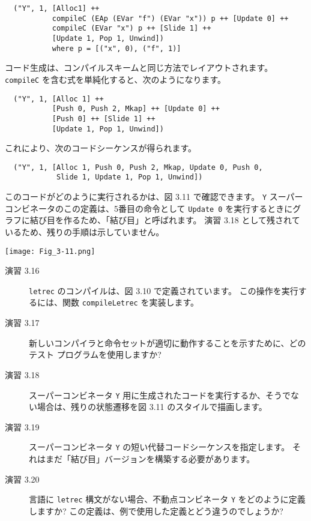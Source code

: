 \documentclass{jarticle}
\begin{document}
\begin{verbatim}
  ("Y", 1, [Alloc1] ++
           compileC (EAp (EVar "f") (EVar "x")) p ++ [Update 0] ++
           compileC (EVar "x") p ++ [Slide 1] ++
           [Update 1, Pop 1, Unwind])
           where p = [("x", 0), ("f", 1)]
\end{verbatim}

コード生成は、コンパイルスキームと同じ方法でレイアウトされます。
\texttt{compileC} を含む式を単純化すると、次のようになります。

\begin{verbatim}
  ("Y", 1, [Alloc 1] ++
           [Push 0, Push 2, Mkap] ++ [Update 0] ++
           [Push 0] ++ [Slide 1] ++
           [Update 1, Pop 1, Unwind])
\end{verbatim}

これにより、次のコードシーケンスが得られます。

\begin{verbatim}
  ("Y", 1, [Alloc 1, Push 0, Push 2, Mkap, Update 0, Push 0,
            Slide 1, Update 1, Pop 1, Unwind])
\end{verbatim}

このコードがどのように実行されるかは、図 3.11 で確認できます。
\texttt{Y} スーパーコンビネータのこの定義は、5番目の命令として \texttt{Update 0} を実行するときにグラフに結び目を作るため、「結び目」と呼ばれます。
演習 3.18 として残されているため、残りの手順は示していません。

\texttt{[image: Fig\_3-11.png]}

\begin{description}
	\item[演習 3.16] \texttt{letrec} のコンパイルは、図 3.10 で定義されています。
		この操作を実行するには、関数 \texttt{compileLetrec} を実装します。

	\item[演習 3.17] 新しいコンパイラと命令セットが適切に動作することを示すために、どのテスト プログラムを使用しますか?

	\item[演習 3.18] スーパーコンビネータ \texttt{Y} 用に生成されたコードを実行するか、そうでない場合は、残りの状態遷移を図 3.11 のスタイルで描画します。

	\item[演習 3.19] スーパーコンビネータ \texttt{Y} の短い代替コードシーケンスを指定します。
		それはまだ「結び目」バージョンを構築する必要があります。

	\item[演習 3.20] 言語に \texttt{letrec} 構文がない場合、不動点コンビネータ \texttt{Y} をどのように定義しますか?
		この定義は、例で使用した定義とどう違うのでしょうか?
\end{description}
\newpage
\end{document}
